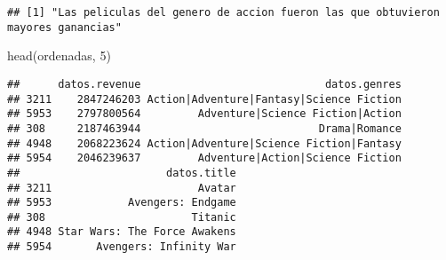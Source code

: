 \documentclass[
]{article}
\newenvironment{Shaded}{\begin{snugshade}}{\end{snugshade}}
\newcommand{\DecValTok}[1]{\textcolor[rgb]{0.00,0.00,0.81}{#1}}
\newcommand{\FunctionTok}[1]{\textcolor[rgb]{0.00,0.00,0.00}{#1}}
\newcommand{\NormalTok}[1]{#1}
\begin{document}
\begin{verbatim}
## [1] "Las peliculas del genero de accion fueron las que obtuvieron mayores ganancias"
\end{verbatim}

\begin{Shaded}
\begin{Highlighting}[]
\FunctionTok{head}\NormalTok{(ordenadas, }\DecValTok{5}\NormalTok{)}
\end{Highlighting}
\end{Shaded}

\begin{verbatim}
##      datos.revenue                             datos.genres
## 3211    2847246203 Action|Adventure|Fantasy|Science Fiction
## 5953    2797800564         Adventure|Science Fiction|Action
## 308     2187463944                            Drama|Romance
## 4948    2068223624 Action|Adventure|Science Fiction|Fantasy
## 5954    2046239637         Adventure|Action|Science Fiction
##                       datos.title
## 3211                       Avatar
## 5953            Avengers: Endgame
## 308                       Titanic
## 4948 Star Wars: The Force Awakens
## 5954       Avengers: Infinity War
\end{verbatim}
\end{document}
